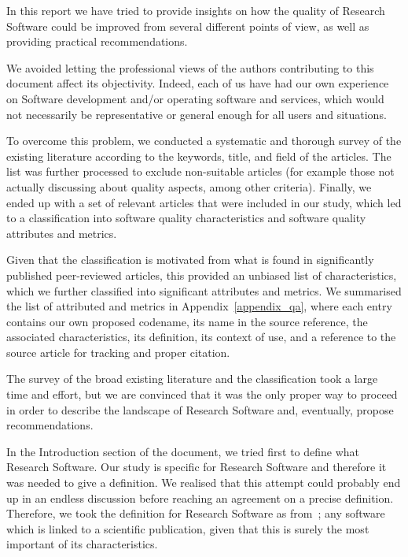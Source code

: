 In this report we have tried to provide insights on how the quality of Research Software could be improved from several different points of view, as well as providing practical recommendations.

We avoided letting the professional views of the authors contributing to this document affect its objectivity. Indeed, each of us have had our own experience on Software development and/or operating software and services, which would not necessarily be representative or general enough for all users and situations.

To overcome this problem, we conducted a systematic and thorough survey of the existing literature according to the keywords, title, and field of the articles. The list was further processed to exclude non-suitable articles (for example  those not actually discussing about quality aspects, among other criteria). Finally, we ended up with a set of relevant articles that were included in our study, which led to a classification into software quality characteristics and software quality attributes and metrics. 

Given that the classification is motivated from what is found in significantly published peer-reviewed articles, this provided an unbiased list of characteristics, which we further classified into significant attributes and metrics. We summarised the list of attributed and metrics in Appendix~\ref{appendix_qa}, where each entry contains our own proposed codename, its name in the source reference, the associated characteristics, its definition, its context of use, and a reference to the source article for tracking and proper citation.

The survey of the broad existing literature and the classification took a large time and effort, but we are convinced that it was the only proper way to proceed in order to describe the landscape of Research Software and, eventually, propose recommendations.

In the Introduction section of the document, we tried first to define what Research Software. Our study is specific for Research Software and therefore it was needed to give a definition. We realised that this attempt could probably end up in an endless discussion before reaching an agreement on a precise definition. Therefore, we took the definition for Research Software as from~\cite{gruenpeter_defining_2021}; any software which is linked to a scientific publication, given that this is surely the most important of its characteristics. 

